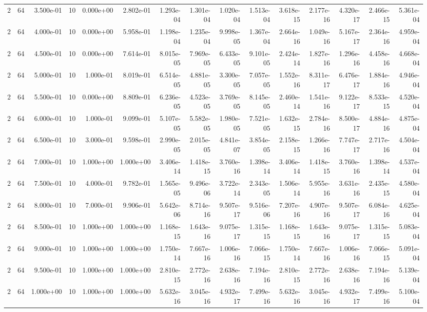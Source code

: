 \begin{tabular}{rrrrrrrrrrrrrrr}
2 & 64 & 3.500e-01 & 10 & 0.000e+00 & 2.802e-01 & 1.293e-04 & 1.301e-04 & 1.020e-04 & 1.513e-04 & 3.618e-15 & 2.177e-16 & 4.320e-17 & 2.466e-15 & 5.361e-04 \\
2 & 64 & 4.000e-01 & 10 & 0.000e+00 & 5.958e-01 & 1.198e-04 & 1.235e-04 & 9.998e-05 & 1.367e-04 & 2.664e-16 & 1.049e-16 & 5.167e-17 & 2.364e-16 & 4.959e-04 \\
2 & 64 & 4.500e-01 & 10 & 0.000e+00 & 7.614e-01 & 8.015e-05 & 7.969e-05 & 6.433e-05 & 9.101e-05 & 2.424e-14 & 1.827e-16 & 1.296e-16 & 4.458e-16 & 4.668e-04 \\
2 & 64 & 5.000e-01 & 10 & 1.000e-01 & 8.019e-01 & 6.514e-05 & 4.881e-05 & 3.300e-05 & 7.057e-05 & 1.552e-16 & 8.311e-17 & 6.476e-17 & 1.884e-16 & 4.946e-04 \\
2 & 64 & 5.500e-01 & 10 & 0.000e+00 & 8.809e-01 & 6.236e-05 & 4.523e-05 & 3.769e-05 & 8.145e-05 & 2.460e-14 & 1.541e-16 & 9.122e-17 & 8.533e-15 & 4.520e-04 \\
2 & 64 & 6.000e-01 & 10 & 1.000e-01 & 9.099e-01 & 5.107e-05 & 5.582e-05 & 1.980e-05 & 7.521e-05 & 1.632e-15 & 2.784e-16 & 8.500e-17 & 4.884e-16 & 4.875e-04 \\
2 & 64 & 6.500e-01 & 10 & 3.000e-01 & 9.598e-01 & 2.990e-05 & 2.015e-05 & 4.841e-07 & 3.854e-05 & 2.158e-15 & 1.266e-16 & 7.747e-17 & 2.717e-16 & 4.504e-04 \\
2 & 64 & 7.000e-01 & 10 & 1.000e+00 & 1.000e+00 & 3.406e-14 & 1.418e-15 & 3.760e-16 & 1.398e-14 & 3.406e-14 & 1.418e-15 & 3.760e-16 & 1.398e-14 & 4.537e-04 \\
2 & 64 & 7.500e-01 & 10 & 4.000e-01 & 9.782e-01 & 1.565e-05 & 9.496e-06 & 3.722e-14 & 2.343e-05 & 1.506e-14 & 5.955e-16 & 3.631e-16 & 2.435e-15 & 4.580e-04 \\
2 & 64 & 8.000e-01 & 10 & 7.000e-01 & 9.906e-01 & 5.642e-06 & 8.714e-16 & 9.507e-17 & 9.516e-06 & 7.207e-16 & 4.907e-16 & 9.507e-17 & 6.084e-16 & 4.625e-04 \\
2 & 64 & 8.500e-01 & 10 & 1.000e+00 & 1.000e+00 & 1.168e-15 & 1.643e-16 & 9.075e-17 & 1.315e-15 & 1.168e-15 & 1.643e-16 & 9.075e-17 & 1.315e-15 & 5.083e-04 \\
2 & 64 & 9.000e-01 & 10 & 1.000e+00 & 1.000e+00 & 1.750e-14 & 7.667e-16 & 1.006e-16 & 7.066e-15 & 1.750e-14 & 7.667e-16 & 1.006e-16 & 7.066e-15 & 5.091e-04 \\
2 & 64 & 9.500e-01 & 10 & 1.000e+00 & 1.000e+00 & 2.810e-15 & 2.772e-16 & 2.638e-16 & 7.194e-16 & 2.810e-15 & 2.772e-16 & 2.638e-16 & 7.194e-16 & 5.139e-04 \\
2 & 64 & 1.000e+00 & 10 & 1.000e+00 & 1.000e+00 & 5.632e-16 & 3.045e-16 & 4.932e-17 & 7.499e-16 & 5.632e-16 & 3.045e-16 & 4.932e-17 & 7.499e-16 & 5.100e-04 \\

\end{tabular}
